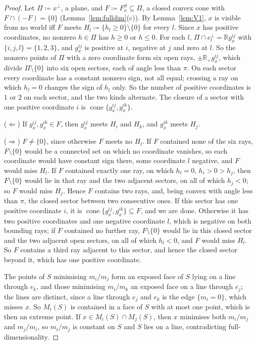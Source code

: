\documentclass[11pt]{article}
\newcommand{\R}{\mathbb{R}}
\DeclareMathOperator{\cone}{cone}
\theoremstyle{plain}
\theoremstyle{definition}
\theoremstyle{remark}
\begin{document}
\begin{proof}
Let $\Pi\coloneqq x^\perp$, a plane, and $F\coloneqq F^S_x\subseteq\Pi$, a closed convex
cone with $F\cap(-F)=\{0\}$ (Lemma~\ref{lem:fulldim}(c)). By Lemma~\ref{lem:V1}, $x$ is
visible from no world iff $F$ meets $H_l\coloneqq\{h_l\ge0\}\setminus\{0\}$ for every
$l$. Since $x$ has positive coordinates, no nonzero $h\in\Pi$ has $h\ge0$ or $h\le0$. For
each $l$, $\Pi\cap e_l^\perp=\R g^{ij}_x$ with $\{i,j,l\}=\{1,2,3\}$, and $g^{ij}_x$ is
positive at $i$, negative at $j$ and zero at $l$. So the nonzero points of $\Pi$ with a
zero coordinate form six open rays, $\pm\R_+g^{ij}_x$, which divide $\Pi\setminus\{0\}$ into
six open sectors, each of angle less than $\pi$. On each sector every coordinate has a
constant nonzero sign, not all equal; crossing a ray on which $h_l=0$ changes the sign of
$h_l$ only. So the number of positive coordinates is $1$ or $2$ on each sector, and the
two kinds alternate. The closure of a sector with one positive coordinate $i$ is
$\cone\{g^{ij}_x,g^{ik}_x\}$.

($\Leftarrow$) If $g^{ij}_x,g^{ik}_x\in F$, then $g^{ij}_x$ meets $H_i$ and $H_k$, and
$g^{ik}_x$ meets $H_j$.

($\Rightarrow$) $F\neq\{0\}$, since otherwise $F$ meets no $H_l$. If $F$ contained none of
the six rays, $F\setminus\{0\}$ would be a connected set on which no coordinate vanishes,
so each coordinate would have constant sign there, some coordinate $l$ negative, and $F$
would miss $H_l$. If $F$ contained exactly one ray, on which $h_l=0$, $h_i>0>h_j$, then
$F\setminus\{0\}$ would lie in that ray and the two adjacent sectors, on all of which
$h_j<0$; so $F$ would miss $H_j$. Hence $F$ contains two rays, and, being convex with
angle less than $\pi$, the closed sector between two consecutive ones. If this sector has
one positive coordinate $i$, it is $\cone\{g^{ij}_x,g^{ik}_x\}\subseteq F$, and we are
done. Otherwise it has two positive coordinates and one negative coordinate $l$, which is
negative on both bounding rays; if $F$ contained no further ray, $F\setminus\{0\}$ would
lie in this closed sector and the two adjacent open sectors, on all of which $h_l<0$, and
$F$ would miss $H_l$. So $F$ contains a third ray adjacent to this sector, and hence the
closed sector beyond it, which has one positive coordinate.

The points of $S$ minimising $m_i/m_j$ form an exposed face of $S$ lying on a line through
$e_k$, and those minimising $m_i/m_k$ an exposed face on a line through $e_j$; the lines
are distinct, since a line through $e_j$ and $e_k$ is the edge $\{m_i=0\}$, which misses
$x$. So $M_i(S)$ is contained in a face of $S$ with at most one point, which is then an
extreme point. If $x\in M_i(S)\cap M_j(S)$, then $x$ minimises both $m_i/m_j$ and $m_j/m_i$,
so $m_i/m_j$ is constant on $S$ and $S$ lies on a line, contradicting
full-dimensionality.
\end{proof}
\end{document}
